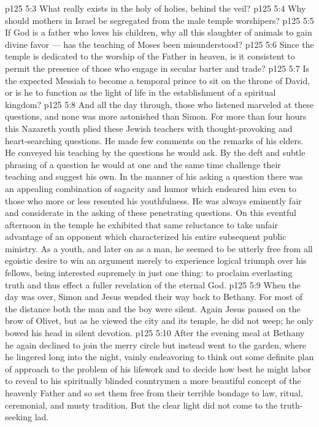 \vs p125 5:3 \bibnobreakspace \textcolor{ubdarkred}{What really exists in the holy of holies, behind the veil?}
\vs p125 5:4 \pc {}\bibnobreakspace \textcolor{ubdarkred}{Why should mothers in Israel be segregated from the male temple worshipers?}
\vs p125 5:5 \pc {}\bibnobreakspace \textcolor{ubdarkred}{If God is a father who loves his children, why all this slaughter of animals to gain divine favor --- has the teaching of Moses been misunderstood?}
\vs p125 5:6 \pc {}\bibnobreakspace \textcolor{ubdarkred}{Since the temple is dedicated to the worship of the Father in heaven, is it consistent to permit the presence of those who engage in secular barter and trade?}
\vs p125 5:7 \pc {}\bibnobreakspace \textcolor{ubdarkred}{Is the expected Messiah to become a temporal prince to sit on the throne of David, or is he to function as the light of life in the establishment of a spiritual kingdom?}
\vs p125 5:8 \pc And all the day through, those who listened marveled at these questions, and none was more astonished than Simon. For more than four hours this Nazareth youth plied these Jewish teachers with thought\hyp{}provoking and heart\hyp{}searching questions. He made few comments on the remarks of his elders. He conveyed his teaching by the questions he would ask. By the deft and subtle phrasing of a question he would at one and the same time challenge their teaching and suggest his own. In the manner of his asking a question there was an appealing combination of sagacity and humor which endeared him even to those who more or less resented his youthfulness. He was always eminently fair and considerate in the asking of these penetrating questions. On this eventful afternoon in the temple he exhibited that same reluctance to take unfair advantage of an opponent which characterized his entire subsequent public ministry. As a youth, and later on as a man, he seemed to be utterly free from all egoistic desire to win an argument merely to experience logical triumph over his fellows, being interested supremely in just one thing: to proclaim everlasting truth and thus effect a fuller revelation of the eternal God.
\vs p125 5:9 \pc When the day was over, Simon and Jesus wended their way back to Bethany. For most of the distance both the man and the boy were silent. Again Jesus paused on the brow of Olivet, but as he viewed the city and its temple, he did not weep; he only bowed his head in silent devotion.
\vs p125 5:10 After the evening meal at Bethany he again declined to join the merry circle but instead went to the garden, where he lingered long into the night, vainly endeavoring to think out some definite plan of approach to the problem of his lifework and to decide how best he might labor to reveal to his spiritually blinded countrymen a more beautiful concept of the heavenly Father and so set them free from their terrible bondage to law, ritual, ceremonial, and musty tradition. But the clear light did not come to the truth\hyp{}seeking lad.
